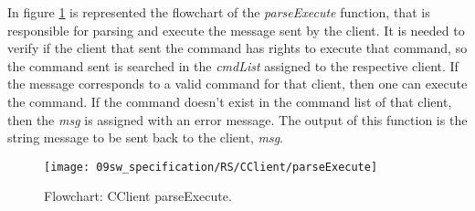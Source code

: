 In figure \ref{fig:parseExecute} is represented the flowchart of the \textit{parseExecute} function, that is responsible for parsing and execute the message sent by the client. It is needed to verify if the client that sent the command has rights to execute that command, so the command sent is searched in the \textit{cmdList} assigned to the respective client. If the message corresponds to a valid command for that client, then one can execute the command. If the command doesn't exist in the command list of that client, then the \textit{msg} is assigned with an error message. The output of this function is the string message to be sent back to the client, \textit{msg}.

\begin{figure}[H]
	\centering
	\texttt{[image: 09sw\_specification/RS/CClient/parseExecute]}
	\caption{Flowchart: CClient parseExecute.}
	\label{fig:parseExecute}
\end{figure}
